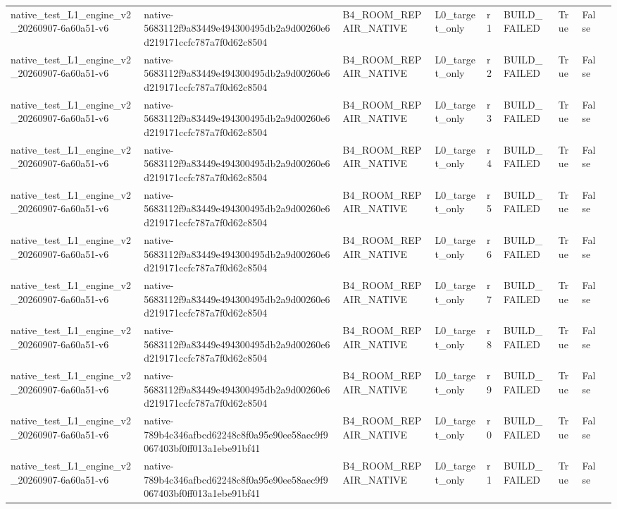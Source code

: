 \begin{tabular}{lllllllll}
native\_test\_L1\_engine\_v2\_20260907-6a60a51-v6 & native-5683112f9a83449e494300495db2a9d00260e6d219171ccfc787a7f0d62c8504 & B4\_ROOM\_REPAIR\_NATIVE & L0\_target\_only & r1 & BUILD\_FAILED & True & False &  \\
native\_test\_L1\_engine\_v2\_20260907-6a60a51-v6 & native-5683112f9a83449e494300495db2a9d00260e6d219171ccfc787a7f0d62c8504 & B4\_ROOM\_REPAIR\_NATIVE & L0\_target\_only & r2 & BUILD\_FAILED & True & False &  \\
native\_test\_L1\_engine\_v2\_20260907-6a60a51-v6 & native-5683112f9a83449e494300495db2a9d00260e6d219171ccfc787a7f0d62c8504 & B4\_ROOM\_REPAIR\_NATIVE & L0\_target\_only & r3 & BUILD\_FAILED & True & False &  \\
native\_test\_L1\_engine\_v2\_20260907-6a60a51-v6 & native-5683112f9a83449e494300495db2a9d00260e6d219171ccfc787a7f0d62c8504 & B4\_ROOM\_REPAIR\_NATIVE & L0\_target\_only & r4 & BUILD\_FAILED & True & False &  \\
native\_test\_L1\_engine\_v2\_20260907-6a60a51-v6 & native-5683112f9a83449e494300495db2a9d00260e6d219171ccfc787a7f0d62c8504 & B4\_ROOM\_REPAIR\_NATIVE & L0\_target\_only & r5 & BUILD\_FAILED & True & False &  \\
native\_test\_L1\_engine\_v2\_20260907-6a60a51-v6 & native-5683112f9a83449e494300495db2a9d00260e6d219171ccfc787a7f0d62c8504 & B4\_ROOM\_REPAIR\_NATIVE & L0\_target\_only & r6 & BUILD\_FAILED & True & False &  \\
native\_test\_L1\_engine\_v2\_20260907-6a60a51-v6 & native-5683112f9a83449e494300495db2a9d00260e6d219171ccfc787a7f0d62c8504 & B4\_ROOM\_REPAIR\_NATIVE & L0\_target\_only & r7 & BUILD\_FAILED & True & False &  \\
native\_test\_L1\_engine\_v2\_20260907-6a60a51-v6 & native-5683112f9a83449e494300495db2a9d00260e6d219171ccfc787a7f0d62c8504 & B4\_ROOM\_REPAIR\_NATIVE & L0\_target\_only & r8 & BUILD\_FAILED & True & False &  \\
native\_test\_L1\_engine\_v2\_20260907-6a60a51-v6 & native-5683112f9a83449e494300495db2a9d00260e6d219171ccfc787a7f0d62c8504 & B4\_ROOM\_REPAIR\_NATIVE & L0\_target\_only & r9 & BUILD\_FAILED & True & False &  \\
native\_test\_L1\_engine\_v2\_20260907-6a60a51-v6 & native-789b4c346afbcd62248c8f0a95e90ee58aec9f9067403bf0ff013a1ebe91bf41 & B4\_ROOM\_REPAIR\_NATIVE & L0\_target\_only & r0 & BUILD\_FAILED & True & False &  \\
native\_test\_L1\_engine\_v2\_20260907-6a60a51-v6 & native-789b4c346afbcd62248c8f0a95e90ee58aec9f9067403bf0ff013a1ebe91bf41 & B4\_ROOM\_REPAIR\_NATIVE & L0\_target\_only & r1 & BUILD\_FAILED & True & False &  \\

\end{tabular}
